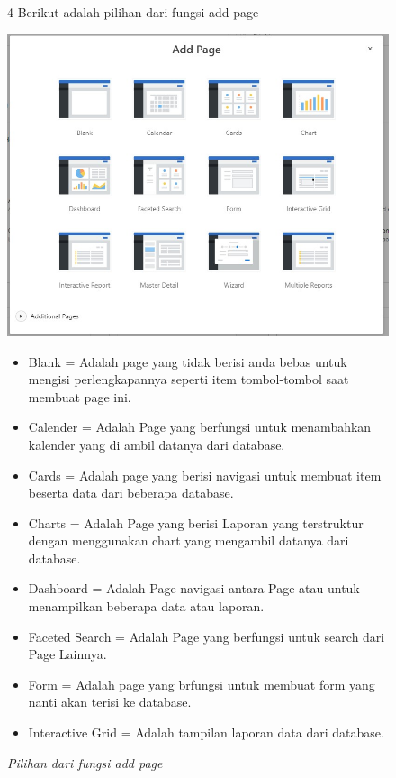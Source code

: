 \begin{itemize}
        \begin{figure}[!htbp]
        \item[4]Berikut adalah pilihan dari fungsi add page
        \begin{center}
        \includegraphics[scale=0.4]{figures/fungsi_add_page.jpg}
        \caption{\textit{Pilihan dari fungsi add page}}
        \end{center}
        \begin{itemize}
            \item Blank = Adalah page yang tidak berisi anda bebas untuk mengisi perlengkapannya seperti item tombol-tombol saat membuat page ini.
            \item Calender = Adalah Page yang berfungsi untuk menambahkan kalender yang di ambil datanya dari database.
            \item Cards = Adalah page yang berisi navigasi untuk membuat item beserta data dari beberapa database.
            \item Charts = Adalah Page yang berisi Laporan yang terstruktur dengan menggunakan chart yang mengambil datanya dari database.
            \item Dashboard = Adalah Page navigasi antara Page atau untuk menampilkan beberapa data atau laporan.
            \item Faceted Search = Adalah Page yang berfungsi untuk search dari Page Lainnya.
            \item Form = Adalah page yang brfungsi untuk membuat form yang nanti akan terisi ke database.
            \item Interactive Grid = Adalah tampilan laporan data dari database.

\end{itemize}
\end{figure}
\end{itemize}
